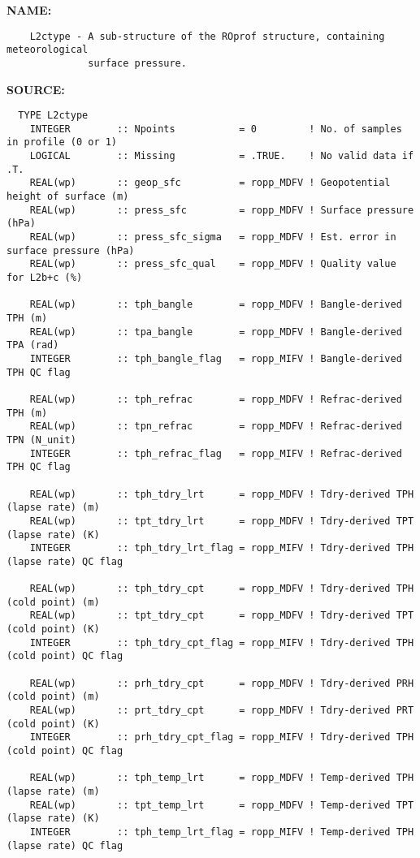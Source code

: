 \label{ch:robo45}
\label{ch:Datatypes_L2ctype}
\textbf{NAME:}\hspace{0.08in}\begin{Verbatim}
    L2ctype - A sub-structure of the ROprof structure, containing meteorological
              surface pressure.
\end{Verbatim}
\textbf{SOURCE:}\hspace{0.08in}\begin{Verbatim}
  TYPE L2ctype
    INTEGER        :: Npoints           = 0         ! No. of samples in profile (0 or 1)
    LOGICAL        :: Missing           = .TRUE.    ! No valid data if .T.
    REAL(wp)       :: geop_sfc          = ropp_MDFV ! Geopotential height of surface (m)
    REAL(wp)       :: press_sfc         = ropp_MDFV ! Surface pressure (hPa)
    REAL(wp)       :: press_sfc_sigma   = ropp_MDFV ! Est. error in surface pressure (hPa)
    REAL(wp)       :: press_sfc_qual    = ropp_MDFV ! Quality value for L2b+c (%)

    REAL(wp)       :: tph_bangle        = ropp_MDFV ! Bangle-derived TPH (m)
    REAL(wp)       :: tpa_bangle        = ropp_MDFV ! Bangle-derived TPA (rad)
    INTEGER        :: tph_bangle_flag   = ropp_MIFV ! Bangle-derived TPH QC flag

    REAL(wp)       :: tph_refrac        = ropp_MDFV ! Refrac-derived TPH (m)
    REAL(wp)       :: tpn_refrac        = ropp_MDFV ! Refrac-derived TPN (N_unit)
    INTEGER        :: tph_refrac_flag   = ropp_MIFV ! Refrac-derived TPH QC flag

    REAL(wp)       :: tph_tdry_lrt      = ropp_MDFV ! Tdry-derived TPH (lapse rate) (m)
    REAL(wp)       :: tpt_tdry_lrt      = ropp_MDFV ! Tdry-derived TPT (lapse rate) (K)
    INTEGER        :: tph_tdry_lrt_flag = ropp_MIFV ! Tdry-derived TPH (lapse rate) QC flag

    REAL(wp)       :: tph_tdry_cpt      = ropp_MDFV ! Tdry-derived TPH (cold point) (m)
    REAL(wp)       :: tpt_tdry_cpt      = ropp_MDFV ! Tdry-derived TPT (cold point) (K)
    INTEGER        :: tph_tdry_cpt_flag = ropp_MIFV ! Tdry-derived TPH (cold point) QC flag

    REAL(wp)       :: prh_tdry_cpt      = ropp_MDFV ! Tdry-derived PRH (cold point) (m)
    REAL(wp)       :: prt_tdry_cpt      = ropp_MDFV ! Tdry-derived PRT (cold point) (K)
    INTEGER        :: prh_tdry_cpt_flag = ropp_MIFV ! Tdry-derived TPH (cold point) QC flag

    REAL(wp)       :: tph_temp_lrt      = ropp_MDFV ! Temp-derived TPH (lapse rate) (m)
    REAL(wp)       :: tpt_temp_lrt      = ropp_MDFV ! Temp-derived TPT (lapse rate) (K)
    INTEGER        :: tph_temp_lrt_flag = ropp_MIFV ! Temp-derived TPH (lapse rate) QC flag


\end{Verbatim}
